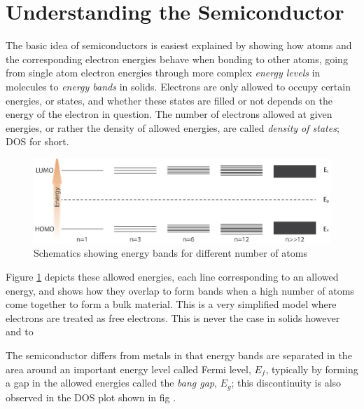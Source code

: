 {\section{Understanding the Semiconductor}

The basic idea of semiconductors is easiest explained by showing how atoms and the corresponding electron energies behave when bonding to other atoms, going from single atom electron energies through more complex \textit{energy levels} in molecules to \textit{energy bands} in solids. Electrons are only allowed to occupy certain energies, or states, and whether these states are filled or not depends on the energy of the electron in question. The number of electrons allowed at given energies, or rather the density of allowed energies,  are called \textit{density of states}; DOS for short.

	\begin{figure}[ht!]
		\centering
		\includegraphics[scale=1]{Figures/Energy_bands1.eps}
		\caption{Schematics showing energy bands for different number of atoms}
		\label{fig:energy_bands}
	\end{figure}

Figure \ref{fig:energy_bands} depicts these allowed energies, each line corresponding to an allowed energy, and shows how they overlap to form bands when a high number of atoms come together to form a bulk material. This is a very simplified model where electrons are treated as free electrons. This is never the case in solids however and to 


The semiconductor differs from metals in that energy bands are separated in the area around an important energy level called Fermi level, $E_f$, typically by  forming a gap in the allowed energies called the \textit{bang gap}, $E_g$; this discontinuity is also observed in the DOS plot shown in fig . 


}
